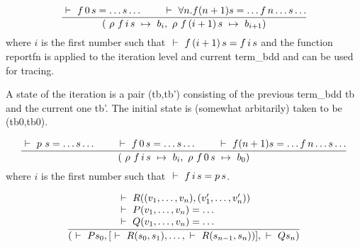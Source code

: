 \bigskip 

\noindent \newsavebox\computeFixedpoint
\begin{lrbox}\computeFixedpoint
{}
{\[\frac{\ \vdash\  f\, 0\, s = \ldots s \ldots \qquad \ \vdash\  \forall n. f (n+1) s = \ldots f\, n \ldots s \ldots}
  {(\mbox{$~\rho~f\, i\, s~\mapsto~b_i$},\mbox{$~\rho~f\, (i+1)\, s~\mapsto~b_{i+1}$})}\]
 where $i$ is the first number such that $\ \vdash\  f\, (i+1)\, s = f\, i\, s$             
and the function reportfn is applied to the iteration level and current   
term\_bdd and can be used for tracing.                                   
                                                                         
A state of the iteration is a pair (tb,tb') consisting of the           
previous term\_bdd tb and the current one tb'. The initial state         
is (somewhat arbitarily) taken to be (tb0,tb0). }
\end{lrbox}             
\fbox{\usebox{\computeFixedpoint}}

\bigskip 

\noindent \newsavebox\computeTrace
\begin{lrbox}\computeTrace
{}
{\[\frac{\ \vdash\  p\ s = \ldots s \ldots \qquad \ \vdash\  f\, 0\, s = \ldots s \ldots \qquad \ \vdash\  f (n+1) s = \ldots f\, n \ldots s \ldots}
  {(\mbox{$~\rho~f\, i\, s~\mapsto~b_i$},\mbox{$~\rho~f\, 0\, s~\mapsto~b_0$})}\]
 where $i$ is the first number such that $\ \vdash\  f\, i\, s = p\, s$. }
\end{lrbox}             
\fbox{\usebox{\computeTrace}}

\bigskip 

\noindent \newsavebox\findTrace
\begin{lrbox}\findTrace
{}
{\[\frac{
    \begin{array}{l}
      \ \vdash\  R((v_1,\ldots,v_n),(v_1',\ldots,v_n')) \\ 
      \ \vdash\  P(v_1,\ldots,v_n) = \ldots \\
      \ \vdash\  Q(v_1,\ldots,v_n) = \ldots \\
    \end{array}}
  {(\ \vdash\  P s_0,[\ \vdash\  R(s_0,s_1),\ldots,\ \vdash\  R(s_{n-1},s_n))],\ \vdash\  Q s_n)}\]}
\end{lrbox}             
\fbox{\usebox{\findTrace}}

